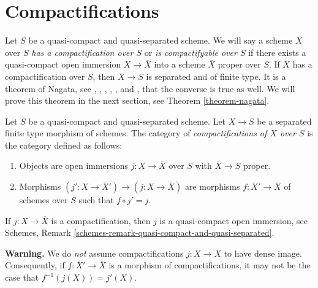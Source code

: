 \section{Compactifications}
\label{section-compactify}

\noindent
Let $S$ be a quasi-compact and quasi-separated scheme. We will say a
scheme $X$ over $S$ {\it has a compactification over $S$}
or {\it is compactifyable over $S$} if there exists
a quasi-compact open immersion $X \to \overline{X}$ into a scheme
$\overline{X}$ proper over $S$. If $X$ has a compactification over
$S$, then $X \to S$ is separated and of finite type. It is a theorem of
Nagata, see \cite{Lutkebohmert}, \cite{Conrad-Nagata}, \cite{Nagata-1},
\cite{Nagata-2}, \cite{Nagata-3}, and \cite{Nagata-4},
that the converse is true as well. We will prove this theorem
in the next section, see Theorem \ref{theorem-nagata}.

\medskip\noindent
Let $S$ be a quasi-compact and quasi-separated scheme.
Let $X \to S$ be a separated finite type morphism of schemes. The category
of {\it compactifications of $X$ over $S$} is the category defined
as follows:
\begin{enumerate}
\item Objects are open immersions $j : X \to \overline{X}$ over $S$ with
$\overline{X} \to S$ proper.
\item Morphisms $(j' : X \to \overline{X}') \to (j : X \to \overline{X})$
are morphisms $f : \overline{X}' \to \overline{X}$ of schemes over $S$
such that $f \circ j' = j$.
\end{enumerate}
If $j : X \to \overline{X}$ is a compactification, then $j$ is a
quasi-compact open immersion, see
Schemes, Remark \ref{schemes-remark-quasi-compact-and-quasi-separated}.

\medskip\noindent
{\bf Warning.} We do {\it not} assume compactifications $j : X \to \overline{X}$
to have dense image. Consequently, if $f : \overline{X}' \to \overline{X}$
is a morphism of compactifications, it may not be the case that
$f^{-1}(j(X)) = j'(X)$.

